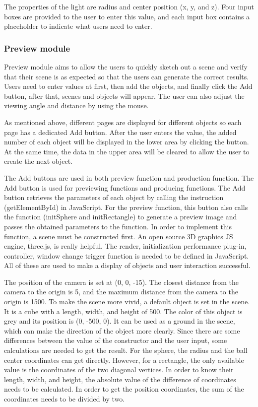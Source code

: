 \documentclass[11pt]{article}
\begin{document}
The properties of the light are radius and center position (x, y, and z). Four input boxes are provided to the user to enter this value, and each input box contains a placeholder to indicate what users need to enter.

\subsubsection{Preview module}
Preview module aims to allow the users to quickly sketch out a scene and verify that their scene is as expected so that the users can generate the correct results. Users need to enter values at first, then add the objects, and finally click the Add button, after that, scenes and objects will appear. The user can also adjust the viewing angle and distance by using the mouse.

As mentioned above, different pages are displayed for different objects so each page has a dedicated Add button. After the user enters the value, the added number of each object will be displayed in the lower area by clicking the button. At the same time, the data in the upper area will be cleared to allow the user to create the next object.

The Add buttons are used in both preview function and production function. The Add button is used for previewing functions and producing functions. The Add button retrieves the parameters of each object by calling the instruction (getElementById) in JavaScript. For the preview function, this button also calls the function (initSphere and initRectangle) to generate a preview image and passes the obtained parameters to the function.
In order to implement this function, a scene must be constructed first. An open source 3D graphics JS engine, three.js, is really helpful. The render, initialization performance plug-in, controller, window change trigger function is needed to be defined in JavaScript. All of these are used to make a display of objects and user interaction successful. 

The position of the camera is set at (0, 0, -15). The closest distance from the camera to the origin is 5, and the maximum distance from the camera to the origin is 1500.
To make the scene more vivid, a default object is set in the scene. It is a cube with a length, width, and height of 500. The color of this object is grey and its position is (0, -500, 0). It can be used as a ground in the scene, which can make the direction of the object more clearly.
Since there are some differences between the value of the constructor and the user input, some calculations are needed to get the result. For the sphere, the radius and the ball center coordinates can get directly. However, for a rectangle, the only available value is the coordinates of the two diagonal vertices. In order to know their length, width, and height, the absolute value of the difference of coordinates needs to be calculated. In order to get the position coordinates, the sum of the coordinates needs to be divided by two.
\end{document}
